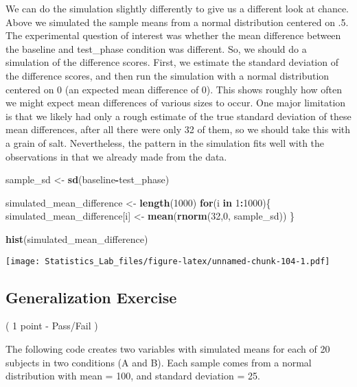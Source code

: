 \documentclass[
]{book}
\newenvironment{Shaded}{\begin{snugshade}}{\end{snugshade}}
\newcommand{\ControlFlowTok}[1]{\textcolor[rgb]{0.13,0.29,0.53}{\textbf{#1}}}
\newcommand{\DecValTok}[1]{\textcolor[rgb]{0.00,0.00,0.81}{#1}}
\newcommand{\FunctionTok}[1]{\textcolor[rgb]{0.13,0.29,0.53}{\textbf{#1}}}
\newcommand{\NormalTok}[1]{#1}
\newcommand{\OtherTok}[1]{\textcolor[rgb]{0.56,0.35,0.01}{#1}}
\newcommand{\SpecialCharTok}[1]{\textcolor[rgb]{0.81,0.36,0.00}{\textbf{#1}}}
\begin{document}
We can do the simulation slightly differently to give us a different look at chance. Above we simulated the sample means from a normal distribution centered on .5. The experimental question of interest was whether the mean difference between the baseline and test\_phase condition was different. So, we should do a simulation of the difference scores. First, we estimate the standard deviation of the difference scores, and then run the simulation with a normal distribution centered on 0 (an expected mean difference of 0). This shows roughly how often we might expect mean differences of various sizes to occur. One major limitation is that we likely had only a rough estimate of the true standard deviation of these mean differences, after all there were only 32 of them, so we should take this with a grain of salt. Nevertheless, the pattern in the simulation fits well with the observations in that we already made from the data.

\begin{Shaded}
\begin{Highlighting}[]
\NormalTok{sample\_sd   }\OtherTok{\textless{}{-}} \FunctionTok{sd}\NormalTok{(baseline}\SpecialCharTok{{-}}\NormalTok{test\_phase)}

\NormalTok{simulated\_mean\_difference }\OtherTok{\textless{}{-}} \FunctionTok{length}\NormalTok{(}\DecValTok{1000}\NormalTok{)}
\ControlFlowTok{for}\NormalTok{(i }\ControlFlowTok{in} \DecValTok{1}\SpecialCharTok{:}\DecValTok{1000}\NormalTok{)\{}
\NormalTok{ simulated\_mean\_difference[i] }\OtherTok{\textless{}{-}} \FunctionTok{mean}\NormalTok{(}\FunctionTok{rnorm}\NormalTok{(}\DecValTok{32}\NormalTok{,}\DecValTok{0}\NormalTok{, sample\_sd))}
\NormalTok{\}}

\FunctionTok{hist}\NormalTok{(simulated\_mean\_difference)}
\end{Highlighting}
\end{Shaded}

\texttt{[image: Statistics\_Lab\_files/figure-latex/unnamed-chunk-104-1.pdf]}

\hypertarget{generalization-exercise-5}{%
\subsection{Generalization Exercise}\label{generalization-exercise-5}}

( 1 point - Pass/Fail )

The following code creates two variables with simulated means for each of 20 subjects in two conditions (A and B). Each sample comes from a normal distribution with mean = 100, and standard deviation = 25.
\end{document}
